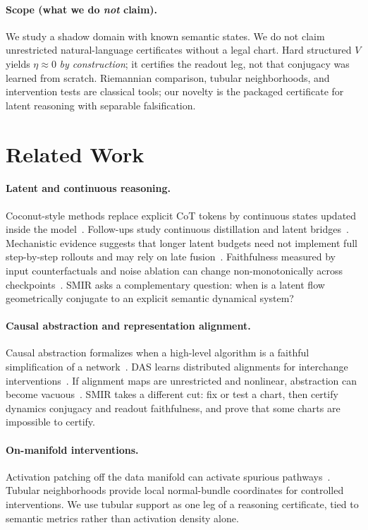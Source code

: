 \documentclass[letterpaper,10pt,twocolumn]{article}
\theoremstyle{definition}
\begin{document}
\paragraph{Scope (what we do \emph{not} claim).}
We study a shadow domain with known semantic states.
We do not claim unrestricted natural-language certificates without a legal chart.
Hard structured $V$ yields $\eta\!\approx\!0$ \emph{by construction}; it certifies the readout leg, not that conjugacy was learned from scratch.
Riemannian comparison, tubular neighborhoods, and intervention tests are classical tools; our novelty is the packaged certificate for latent reasoning with separable falsification.

\section{Related Work}
\label{sec:related}

\paragraph{Latent and continuous reasoning.}
Coconut-style methods replace explicit CoT tokens by continuous states updated inside the model~\citep{hao2024coconut}.
Follow-ups study continuous distillation and latent bridges~\citep{zhu2025codi,latentcot2025mech}.
Mechanistic evidence suggests that longer latent budgets need not implement full step-by-step rollouts and may rely on late fusion~\citep{latentcot2025mech}.
Faithfulness measured by input counterfactuals and noise ablation can change non-monotonically across checkpoints~\citep{faithful2025latent}.
SMIR asks a complementary question: when is a latent flow geometrically conjugate to an explicit semantic dynamical system?

\paragraph{Causal abstraction and representation alignment.}
Causal abstraction formalizes when a high-level algorithm is a faithful simplification of a network~\citep{geiger2021causal}.
DAS learns distributed alignments for interchange interventions~\citep{geiger2024das}.
If alignment maps are unrestricted and nonlinear, abstraction can become vacuous~\citep{nonlinear2025}.
SMIR takes a different cut: fix or test a chart, then certify dynamics conjugacy and readout faithfulness, and prove that some charts are impossible to certify.

\paragraph{On-manifold interventions.}
Activation patching off the data manifold can activate spurious pathways~\citep{onmanifold2025}.
Tubular neighborhoods provide local normal-bundle coordinates for controlled interventions.
We use tubular support as one leg of a reasoning certificate, tied to semantic metrics rather than activation density alone.
\end{document}
